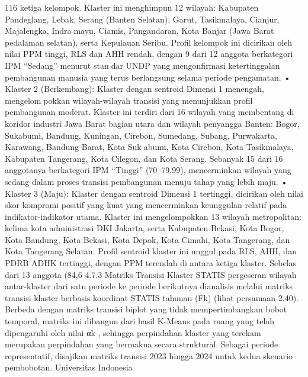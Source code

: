116
ketiga kelompok. Klaster ini menghimpun 12 wilayah: Kabupaten Pandeglang,
Lebak, Serang (Banten Selatan), Garut, Tasikmalaya, Cianjur, Majalengka, Indramayu, Ciamis, Pangandaran, Kota Banjar (Jawa Barat pedalaman selatan), serta
Kepulauan Seribu. Profil kelompok ini dicirikan oleh nilai PPM tinggi, RLS dan
AHH rendah, dengan 9 dari 12 anggota berkategori IPM “Sedang” menurut standar UNDP yang mengonfirmasi ketertinggalan pembangunan manusia yang terus
berlangsung selama periode pengamatan.
• Klaster 2 (Berkembang): Klaster dengan sentroid Dimensi 1 menengah, mengelompokkan wilayah-wilayah transisi yang menunjukkan profil pembangunan moderat.
Klaster ini terdiri dari 16 wilayah yang membentang di koridor industri Jawa Barat
bagian utara dan wilayah penyangga Banten: Bogor, Sukabumi, Bandung, Kuningan,
Cirebon, Sumedang, Subang, Purwakarta, Karawang, Bandung Barat, Kota Sukabumi, Kota Cirebon, Kota Tasikmalaya, Kabupaten Tangerang, Kota Cilegon, dan
Kota Serang. Sebanyak 15 dari 16 anggotanya berkategori IPM “Tinggi” (70–79,99),
mencerminkan wilayah yang sedang dalam proses transisi pembangunan menuju
tahap yang lebih maju.
• Klaster 3 (Maju): Klaster dengan sentroid Dimensi 1 tertinggi, dicirikan oleh
nilai skor kompromi positif yang kuat yang mencerminkan keunggulan relatif pada
indikator-indikator utama. Klaster ini mengelompokkan 13 wilayah metropolitan:
kelima kota administrasi DKI Jakarta, serta Kabupaten Bekasi, Kota Bogor, Kota
Bandung, Kota Bekasi, Kota Depok, Kota Cimahi, Kota Tangerang, dan Kota
Tangerang Selatan. Profil sentroid klaster ini unggul pada RLS, AHH, dan PDRB
ADHK tertinggi, dengan PPM terendah di antara ketiga klaster. Sebelas dari 13
anggota (84,6%
4.7.3 Matriks Transisi Klaster STATIS
pergeseran wilayah antar-klaster dari satu periode ke periode berikutnya dianalisis
melalui matriks transisi klaster berbasis koordinat STATIS tahunan (Fk) (lihat persamaan
2.40). Berbeda dengan matriks transisi biplot yang tidak mempertimbangkan bobot
temporal, matriks ini dibangun dari hasil K-Means pada ruang yang telah dipengaruhi
oleh nilai αk , sehingga perpindahan klaster yang terekam merupakan perpindahan yang
bermakna secara struktural. Sebagai periode representatif, disajikan matriks transisi 2023
hingga 2024 untuk kedua skenario pembobotan.
Universitas Indonesia

